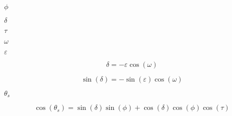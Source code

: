 \documentclass{article}
\begin{document}
$\phi$
\pagebreak

$\delta$
\pagebreak

$\tau$
\pagebreak

$\omega$
\pagebreak

$\varepsilon$
\pagebreak

\[ \delta = -\varepsilon \cos(\omega) \]
\pagebreak

\[ \sin(\delta) = -\sin(\varepsilon) \cos(\omega) \]
\pagebreak

$\theta_s$
\pagebreak

\[ \cos(\theta_s) = \sin(\delta) \sin(\phi) + \cos(\delta) \cos(\phi) \cos(\tau) \]
\pagebreak
\end{document}
